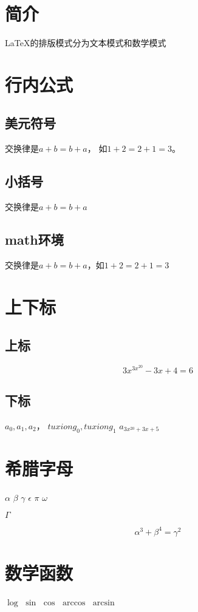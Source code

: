 \documentclass{article}
\begin{document}
    \section{简介}
    \LaTeX 的排版模式分为文本模式和数学模式
    \section{行内公式}
    \subsection{美元符号}
    交换律是$a+b=b+a$， 如$1+2=2+1=3$。
    \subsection{小括号}
    交换律是\(a+b=b+a\)
    \subsection{math环境}
    交换律是\begin{math}a+b=b+a\end{math}，如\begin{math}1+2=2+1=3\end{math}
    \section{上下标}
    \subsection{上标}
    $$3x^{3x^{20}} - 3x + 4 = 6$$
    \subsection{下标}
    $a_0, a_1, a_2$， \(tuxiong_0, tuxiong_1\)
    \begin{math}
        a_{3x^{20} + 3x + 5}
    \end{math}
    \section{希腊字母}
    $\alpha$
    $\beta$
    $\gamma$
    $\epsilon$
    $\pi$
    $\omega$

    $\Gamma$

    $$\alpha^3 + \beta^4 = \gamma^2$$
    \section{数学函数}
    $\log$
    $\sin$
    $\cos$
    $\arccos$
    $\arcsin$
\end{document}
